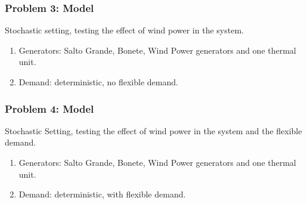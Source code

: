 \documentclass[aspectratio=169]{beamer}\usepackage[utf8]{inputenc}
\begin{document}
\begin{frame}\frametitle{Problem 3: Model}
Stochastic setting, testing the effect of wind power in the system.
\begin{enumerate}
\item Generators: Salto Grande, Bonete, Wind Power generators and one thermal unit.
\item Demand: deterministic, no flexible demand.
\end{enumerate}
\end{frame}

\begin{frame}\frametitle{Problem 4: Model}
Stochastic Setting, testing the effect of wind power in the system and the flexible demand.
\begin{enumerate}
\item Generators: Salto Grande, Bonete, Wind Power generators and one thermal unit.
\item Demand: deterministic, with flexible demand.
\end{enumerate} 
\end{frame}
\end{document}
